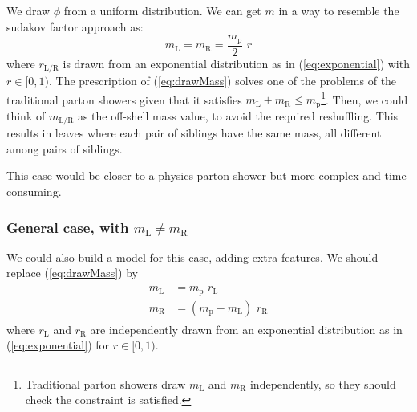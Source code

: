 \documentclass[12pt]{article}
\def\beq{\begin{equation}}
\def\eeq{\end{equation}}
\def\beq{\begin{equation}}
\def\eeq{\end{equation}}
\newcommand{\bea}{\begin{eqnarray}\begin{aligned}}
\newcommand{\eea}{\end{aligned}\end{eqnarray}}
\begin{document}
We draw $\phi$ from a uniform distribution. We can get $m$ in a way to resemble the sudakov factor approach as:
\beq\label{eq:drawMass}
m_{\text{L}} = m_{\text{R}} = \frac{m_{\text{p}}}{2}\,\,  r 
\eeq
where $r_{\text{L/R}}$ is drawn from an exponential distribution as in (\ref{eq:exponential}) with $r \in [0,1)$. The prescription of (\ref{eq:drawMass}) solves one of the problems of the traditional parton showers given that it satisfies $m_{\text{L}} + m_{\text{R}} \leq m_{\text{p}}$\footnote{Traditional parton showers draw $m_{\text{L}}$ and $m_{\text{R}}$ independently, so they should check the constraint is satisfied.}. Then, we could think of $m_{\text{L/R}}$ as the off-shell mass value, to avoid the required reshuffling. This results in leaves where each pair of siblings have the same mass, all different among pairs of siblings.


This case would be closer to a physics parton shower but more complex and time consuming.

\subsubsection{General case, with  $m_{\text{L}}\neq m_{\text{R}}$}

We could also build a model for this case, adding extra features. 
We should replace (\ref{eq:drawMass}) by
\bea
m_{\text{L}} &= m_{\text{p}}\,\,  r_{\text{L}}  \\
m_{\text{R}} &= (m_{\text{p}}-m_{\text{L}})\,\,  r_{\text{R}}
\eea
where $r_{\text{L}}$ and $r_{\text{R}}$ are independently drawn from an exponential distribution as in (\ref{eq:exponential}) for $r \in [0,1)$.
\end{document}
